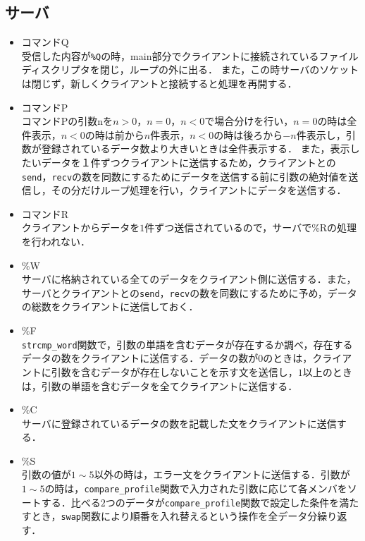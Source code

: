 \documentclass{jarticle}[11pt]
\begin{document}
\subsection{サーバ}
\begin{itemize}
\item コマンドQ \\
受信した内容が\verb|%Q|の時，main部分でクライアントに接続されているファイルディスクリプタを閉じ，ループの外に出る．
また，この時サーバのソケットは閉じず，新しくクライアントと接続すると処理を再開する．

\item コマンドP \\
コマンドPの引数nを$n>0，n=0，n<0$で場合分けを行い，$n=0$の時は全件表示，$n<0$の時は前から$n$件表示，$n<0$の時は後ろから$-n$件表示し，引数が登録されているデータ数より大きいときは全件表示する．
  また，表示したいデータを１件ずつクライアントに送信するため，クライアントとの\verb|send|，\verb|recv|の数を同数にするためにデータを送信する前に引数の絶対値を送信し，その分だけループ処理を行い，クライアントにデータを送信する．

\item コマンドR \\
クライアントからデータを$1$件ずつ送信されているので，サーバで\%Rの処理を行われない．

\item \%W \\
サーバに格納されている全てのデータをクライアント側に送信する．また，サーバとクライアントとの\verb|send|，\verb|recv|の数を同数にするために予め，データの総数をクライアントに送信しておく．

\item \%F \\
\verb|strcmp_word|関数で，引数の単語を含むデータが存在するか調べ，存在するデータの数をクライアントに送信する．データの数が$0$のときは，クライアントに引数を含むデータが存在しないことを示す文を送信し，$1$以上のときは，引数の単語を含むデータを全てクライアントに送信する．

\item \%C \\
サーバに登録されているデータの数を記載した文をクライアントに送信する．

\item \%S \\
引数の値が$1\sim5$以外の時は，エラー文をクライアントに送信する．引数が$1\sim5$の時は，\verb|compare_profile|関数で入力された引数に応じて各メンバをソートする．比べる$2$つのデータが\verb|compare_profile|関数で設定した条件を満たすとき，\verb|swap|関数により順番を入れ替えるという操作を全データ分繰り返す．


\end{itemize}
\end{document}
